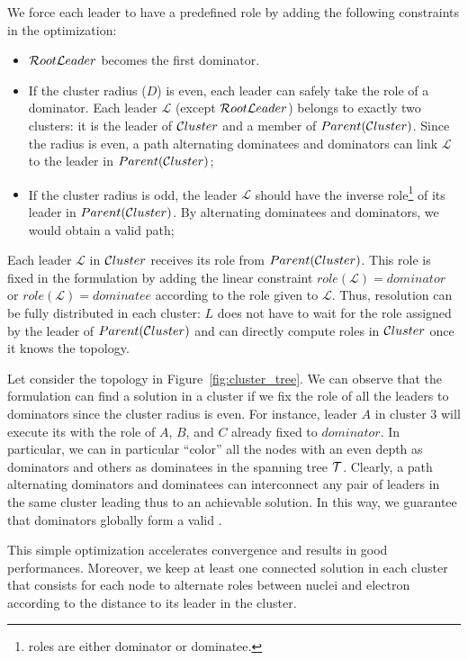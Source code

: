 \documentclass[twoside]{article}
\begin{document}
We force each leader to have a predefined role by adding the
following constraints in the \milp optimization:

\begin{itemize}
\item $\mathcal{R}oot\mathcal{L}eader$ becomes the first dominator.
	
\item If the cluster radius ($D$) is even, each leader can safely take
  the role of a dominator. Each leader $\mathcal{L}$ (except
  $\mathcal{R}oot\mathcal{L}eader$) belongs to exactly two clusters: it is the leader of
  $\mathcal{C}luster$ and a member of $Parent(\mathcal{C}luster)$. Since the radius is
  even, a path alternating dominatees and dominators can link
  $\mathcal{L}$ to the leader in $Parent(\mathcal{C}luster)$;

\item If the cluster radius is odd, the leader $\mathcal{L}$ should
  have the inverse role\footnote{roles are either dominator or
    dominatee.\label{footnote:inverse_roles}} of its leader in
  $Parent(\mathcal{C}luster)$. By alternating dominatees and dominators, we
  would obtain a valid path;
\end{itemize}

Each leader $\mathcal{L}$ in $\mathcal{C}luster$ receives its role from
$Parent(\mathcal{C}luster)$. This role is fixed in the \milp formulation by
adding the linear constraint $role(\mathcal{L})=dominator$ or
$role(\mathcal{L})=dominatee$ according to the role given to
$\mathcal{L}$. Thus, \milp resolution can be fully distributed in each
cluster: $L$ does not have to wait for the role assigned by the leader
of $Parent(\mathcal{C}luster)$ and can directly compute roles in $\mathcal{C}luster$
once it knows the topology.

Let consider the topology in Figure~\ref{fig:cluster_tree}. We can
observe that the \milp formulation can find a solution in a cluster if
we fix the role of all the leaders to dominators since the cluster
radius is even. For instance, leader $A$ in cluster $3$ will execute
its \milp with the role of $A$, $B$, and $C$ already fixed to
$dominator$. In particular, we can in particular ``color'' all the
nodes with an even depth as dominators and others as dominatees in the
spanning tree $\mathcal{T}$. Clearly, a path alternating dominators and
dominatees can interconnect any pair of leaders in the same cluster
leading thus to an achievable solution. In this way, we guarantee that
dominators globally form a valid \rwcds.

This simple optimization accelerates convergence and results in good
performances. Moreover, we keep at least one connected solution in
each cluster that consists for each node to alternate roles between
nuclei and electron according to the distance to its leader in the
cluster.
\end{document}
